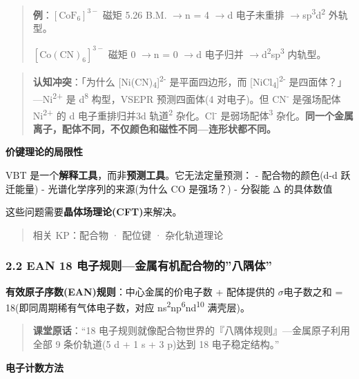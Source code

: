 \documentclass[a4paper,11pt]{ctexart}
\newcommand{\箭}{\ensuremath{\rightarrow}}
\newcommand{\左箭}{\ensuremath{\leftarrow}}
\newcommand{\上箭}{\ensuremath{\uparrow}}
\newcommand{\下箭}{\ensuremath{\downarrow}}
\newcommand{\衡}{\ensuremath{\rightleftharpoons}}
\newcommand{\双箭}{\ensuremath{\leftrightarrow}}
\newcommand{\约等于}{\ensuremath{\approx}}
\newcommand{\小于等于}{\ensuremath{\leq}}
\newcommand{\大于等于}{\ensuremath{\geq}}
\newcommand{\不等于}{\ensuremath{\neq}}
\newcommand{\西格马}{\ensuremath{\sigma}}
\newcommand{\派}{\ensuremath{\pi}}
\begin{document}
\begin{quote}
\textbf{例}：\([\mathrm{CoF_6}]^{3-}\) 磁矩 5.26 B.M. \箭 n = 4 \箭 d 电子未重排 \箭 sp\textsuperscript{3}d\textsuperscript{2} 外轨型。

\([\mathrm{Co(CN)_6}]^{3-}\) 磁矩 0 \箭 n = 0 \箭 d 电子归并 \箭 d\textsuperscript{2}sp\textsuperscript{3} 内轨型。
\end{quote}

\begin{quote}
\textbf{认知冲突}：「为什么 {[}Ni(CN)\textsubscript{4}{]}\textsuperscript{2-} 是平面四边形，而 {[}NiCl\textsubscript{4}{]}\textsuperscript{2-} 是四面体？」---Ni\textsuperscript{2+} 是 d\textsuperscript{8} 构型，VSEPR 预测四面体(4 对电子)。但 CN\textsuperscript{-} 是强场配体 Ni\textsuperscript{2+} 的 d 电子重排归并 3d 轨道\textsuperscript{2} 杂化。Cl\textsuperscript{-} 是弱场配体\textsuperscript{3} 杂化。\textbf{同一个金属离子，配体不同，不仅颜色和磁性不同---连形状都不同。}
\end{quote}

\textbf{价键理论的局限性}

VBT 是一个\textbf{解释工具}，而非\textbf{预测工具}。它无法定量预测：
- 配合物的颜色(d-d 跃迁能量)
- 光谱化学序列的来源(为什么 CO 是强场？)
- 分裂能 Δ 的具体数值

这些问题需要\textbf{晶体场理论(CFT)}来解决。

\begin{quote}
相关 KP：配合物 · 配位键 · 杂化轨道理论
\end{quote}

\subsubsection{2.2 EAN 18 电子规则---金属有机配合物的''八隅体''}\label{ean-18-ux7535ux5b50ux89c4ux5219ux91d1ux5c5eux6709ux673aux914dux5408ux7269ux7684ux516bux9685ux4f53}

\textbf{有效原子序数(EAN)规则}：中心金属的价电子数 + 配体提供的 \西格马 电子数之和 = 18(即同周期稀有气体电子数，对应 ns\textsuperscript{2}np\textsuperscript{6}nd\textsuperscript{10} 满壳层)。

\begin{quote}
\textbf{课堂原话}：``18 电子规则就像配合物世界的『八隅体规则』---金属原子利用全部 9 条价轨道(5 d + 1 s + 3 p)达到 18 电子稳定结构。''
\end{quote}

\textbf{电子计数方法}
\end{document}
